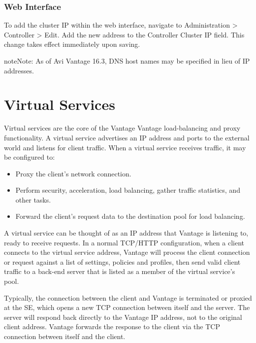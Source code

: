 \documentclass[letterpaper,10pt,english]{sphinxmanual}
\let\sphinxpxdimen\pdfpxdimen\else\newdimen\sphinxpxdimen
\begin{document}
\subsubsection{Web Interface}
\label{\detokenize{getting_started/controller_cluster_ip:web-interface}}
To add the cluster IP within the web interface, navigate to Administration \textgreater{} Controller \textgreater{} Edit. Add the new address to the Controller Cluster IP field. This change takes effect immediately upon saving.

\begin{sphinxadmonition}{note}{Note:}
As of Avi Vantage 16.3, DNS host names may be specified in lieu of IP addresses.
\end{sphinxadmonition}

\noindent\sphinxincludegraphics[width=600\sphinxpxdimen]{{cluster-config-example}.png}


\section{Virtual Services}
\label{\detokenize{getting_started/virtual_services:virtual-services}}\label{\detokenize{getting_started/virtual_services::doc}}
Virtual services are the core of the Vantage Vantage load-balancing and proxy functionality. A virtual service advertises an IP address and ports to the external world and listens for client traffic. When a virtual service receives traffic, it may be configured to:
\begin{itemize}
\item {} 
Proxy the client’s network connection.

\item {} 
Perform security, acceleration, load balancing, gather traffic statistics, and other tasks.

\item {} 
Forward the client’s request data to the destination pool for load balancing.

\end{itemize}

A virtual service can be thought of as an IP address that Vantage is listening to, ready to receive requests. In a normal TCP/HTTP configuration, when a client connects to the virtual service address, Vantage will process the client connection or request against a list of settings, policies and profiles, then send valid client traffic to a back-end server that is listed as a member of the virtual service’s pool.

Typically, the connection between the client and Vantage is terminated or proxied at the SE, which opens a new TCP connection between itself and the server. The server will respond back directly to the Vantage IP address, not to the original client address. Vantage forwards the response to the client via the TCP connection between itself and the client.
\end{document}
